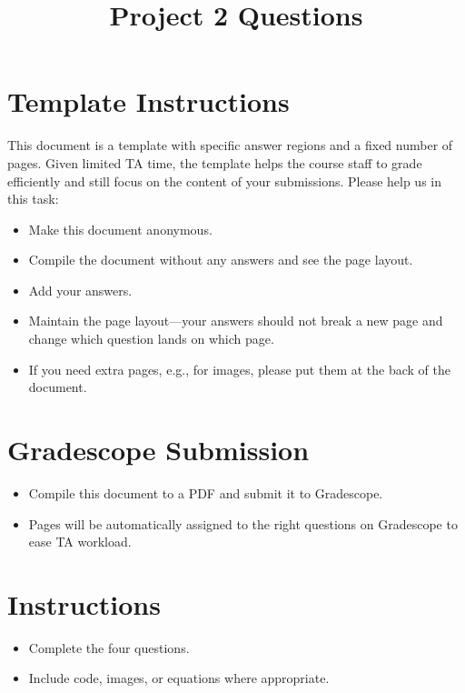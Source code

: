 \documentclass[11pt]{article}
\date{}
\title{\vspace{-1cm}Project 2 Questions}
\begin{document}
\maketitle
\vspace{-3cm}
\thispagestyle{fancy}

\section*{Template Instructions}

This document is a template with specific answer regions and a fixed number of pages.
Given limited TA time, the template helps the course staff to grade efficiently and still focus on the content of your submissions. Please help us in this task:
 
\begin{itemize}
  \item Make this document anonymous.
  \item Compile the document without any answers and see the page layout.
  \item Add your answers.
  \item Maintain the page layout---your answers should not break a new page and change which question lands on which page.

  \item If you need extra pages, e.g., for images, please put them at the back of the document.
\end{itemize}

\section*{Gradescope Submission}
\begin{itemize}
  \item Compile this document to a PDF and submit it to Gradescope.
  \item Pages will be automatically assigned to the right questions on Gradescope to ease TA workload.
\end{itemize}

\section*{Instructions}
\begin{itemize}
  \item Complete the four questions.
  \item Include code, images, or equations where appropriate.
\end{itemize}
\end{document}
